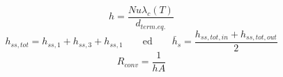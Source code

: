 \documentclass[a4paper,10pt]{article}                                                                                       %
\begin{document}
\vspace{3mm}                                                                                                                %
\begin{equation}                                                                                                            %
  h = \frac{Nu\lambda_c(T)}{d_{term.eq.}}                                                                                   %
  \label{eqn:h}                                                                                                             %
\end{equation}                                                                                                              %
\vspace{3mm}                                                                                                                %
\begin{equation}                                                                                                            %
  h_{ss,tot} = h_{ss,1}+h_{ss,3}+h_{ss,1}                                                                                   %
  \qquad\text{ed}\qquad                                                                                                     %
  \bar{h}_{s} = \frac{h_{ss,tot,in}+h_{ss,tot,out}}{2}                                                                      %
  \label{eqn:h_s}                                                                                                           %
\end{equation}                                                                                                              %
\vspace{3mm}                                                                                                                %
\begin{equation}                                                                                                            %
  R_{conv} = \frac{1}{hA}                                                                                                   %
  \label{eqn:conv_r}                                                                                                        %
\end{equation}                                                                                                              %
\end{document}
